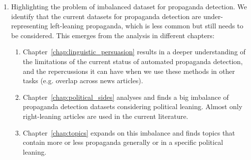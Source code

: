 \begin{enumerate}
\begin{enumerate}
          \end{enumerate}
    \item Highlighting the problem of imbalanced dataset for propaganda detection.
          We identify that the current datasets for propaganda detection are under-representing left-leaning propaganda, which is less common but still needs to be considered.
          This emerges from the analysis in different chapters:
          \begin{enumerate}
              \item Chapter~\ref{chap:linguistic_persuasion} results in a deeper understanding of the limitations of the current status of automated propaganda detection, and the repercussions it can have when we use these methods in other tasks (e.g. overlap across news articles).
              \item Chapter~\ref{chap:political_sides} analyses and finds a big imbalance of propaganda detection datasets considering political leaning. Almost only right-leaning articles are used in the current literature.
              \item Chapter~\ref{chap:topics} expands on this imbalance and finds topics that contain more or less propaganda generally or in a specific political leaning.
          \end{enumerate}



\end{enumerate}
